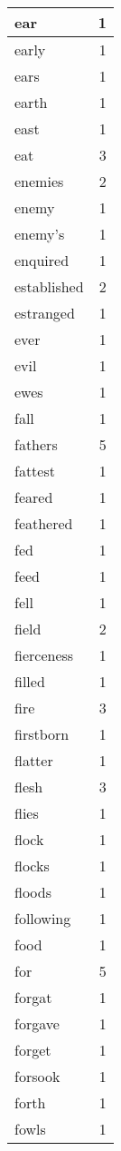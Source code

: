 \begin{center}
\begin{longtable}{l|r}
ear & 1\\ \hline 
early & 1\\ \hline 
ears & 1\\ \hline 
earth & 1\\ \hline 
east & 1\\ \hline 
eat & 3\\ \hline 
enemies & 2\\ \hline 
enemy & 1\\ \hline 
enemy's & 1\\ \hline 
enquired & 1\\ \hline 
established & 2\\ \hline 
estranged & 1\\ \hline 
ever & 1\\ \hline 
evil & 1\\ \hline 
ewes & 1\\ \hline 
fall & 1\\ \hline 
fathers & 5\\ \hline 
fattest & 1\\ \hline 
feared & 1\\ \hline 
feathered & 1\\ \hline 
fed & 1\\ \hline 
feed & 1\\ \hline 
fell & 1\\ \hline 
field & 2\\ \hline 
fierceness & 1\\ \hline 
filled & 1\\ \hline 
fire & 3\\ \hline 
firstborn & 1\\ \hline 
flatter & 1\\ \hline 
flesh & 3\\ \hline 
flies & 1\\ \hline 
flock & 1\\ \hline 
flocks & 1\\ \hline 
floods & 1\\ \hline 
following & 1\\ \hline 
food & 1\\ \hline 
for & 5\\ \hline 
forgat & 1\\ \hline 
forgave & 1\\ \hline 
forget & 1\\ \hline 
forsook & 1\\ \hline 
forth & 1\\ \hline 
fowls & 1\\ \hline 

\end{longtable}
\end{center}
